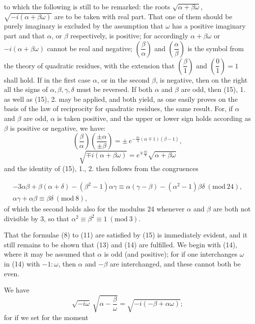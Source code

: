 to which the following is still to be remarked: the roots $\sqrt{\alpha+\beta\omega}$,
$\sqrt{-i(\alpha+\beta\omega)}$ are to be taken with  real part.
That one of them should be purely imaginary is excluded by the assumption
that $\omega$ has a positive imaginary part and that $\alpha$, or $\beta$
respectively, is positive; for accordingly $\alpha+\beta\omega$ or $-i(\alpha+\beta\omega)$
cannot be real and negative; $\left(\dfrac{\beta}{\alpha}\right)$ and
$\left(\dfrac{\alpha}{\beta}\right)$ is the  symbol
from the theory of quadratic residues, with the extension that
$\left(\dfrac{\beta}{1}\right)$ and $\left(\dfrac{0}{1}\right)=1$ shall hold. If
in the first case $\alpha$, or in the second $\beta$, is negative, then on the right
all the signs of $\alpha, \beta, \gamma, \delta$ must be reversed.
If both $\alpha$ and $\beta$ are odd, then (15), 1. as well as (15), 2.
may be applied, and both yield, as one easily proves on the basis
of the law of reciprocity for quadratic residues, the same
 result. For, if $\alpha$ and $\beta$ are odd,
$\alpha$ is taken positive, and the upper or lower sign
holds according as $\beta$ is positive or negative, we have:
\[
\left(\frac{\beta}{\alpha}\right)\left(\frac{\pm\alpha}{\pm\beta}\right)
= \pm\, e^{-\frac{\pi i}{4}(\alpha\mp1)(\beta-1)},
\]
\[
\sqrt{\mp i(\alpha+\beta\omega)} = e^{\mp\frac{\pi i}{4}}\sqrt{\alpha+\beta\omega}
\]
and the identity of (15), 1., 2. then follows from the congruences

\[
\begin{gathered}
-3\alpha\beta+\beta(\alpha+\delta)-(\beta^2-1)\alpha\gamma \equiv \alpha(\gamma-\beta)-(\alpha^2-1)\beta\delta \ (\mathrm{mod}\ 24), \\
\alpha\gamma+\alpha\beta \equiv \beta\delta \ (\mathrm{mod}\ 8),
\end{gathered}
\]
of which the second holds also for the modulus 24 whenever $\alpha$ and $\beta$
are both not divisible by 3, so that $\alpha^2\equiv\beta^2\equiv1 \ (\mathrm{mod}\ 3)$.

That the formulae (8) to (11) are satisfied by (15) is
immediately evident, and it still remains to be shown that (13)
and (14) are fulfilled. We begin with (14), where it may be
assumed that $\alpha$ is odd (and positive); for if one interchanges
$\omega$ in (14) with $-1:\omega$, then $\alpha$ and $-\beta$ are interchanged, and
these cannot both be even.

We have
\[
\sqrt{-i\omega}\ \sqrt{\alpha-\frac{\beta}{\omega}} = \sqrt{-i(-\beta+\alpha\omega)};
\]
for if we set for the moment
